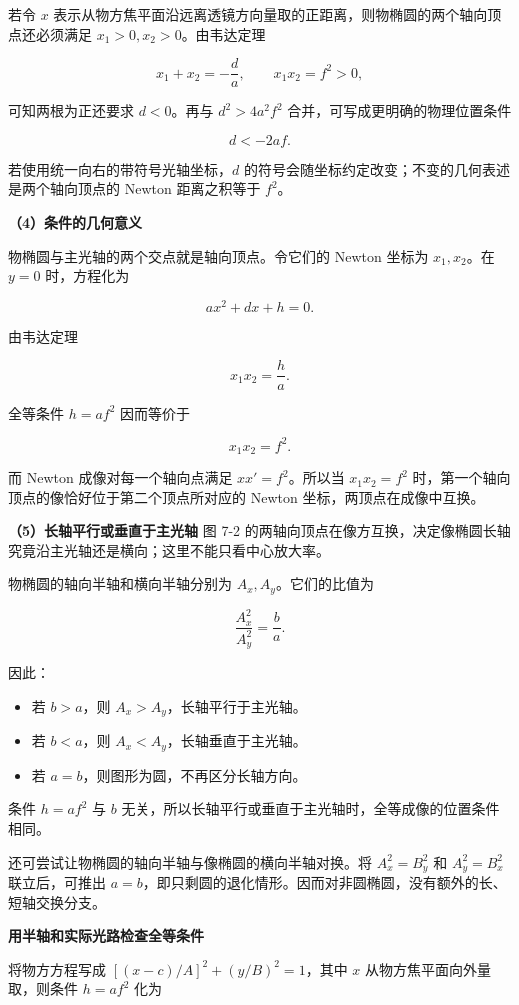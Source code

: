 \documentclass[12pt,a4paper,UTF8]{ctexart}
\newcommand{\tightlist}{\setlength{\itemsep}{0pt}\setlength{\parskip}{0pt}}
\begin{document}
若令 \(x\)
表示从物方焦平面沿远离透镜方向量取的正距离，则物椭圆的两个轴向顶点还必须满足
\(x_1>0,x_2>0\)。由韦达定理

\[x_1+x_2=-\frac da,\qquad x_1x_2=f^2>0,\]

可知两根为正还要求 \(d<0\)。再与 \(d^2>4a^2f^2\)
合并，可写成更明确的物理位置条件

\[\boxed{d<-2af}.\]

若使用统一向右的带符号光轴坐标，\(d\)
的符号会随坐标约定改变；不变的几何表述是两个轴向顶点的 Newton
距离之积等于 \(f^2\)。

\textbf{（4）条件的几何意义}

物椭圆与主光轴的两个交点就是轴向顶点。令它们的 Newton 坐标为
\(x_1,x_2\)。在 \(y=0\) 时，方程化为

\[ax^2+dx+h=0.\]

由韦达定理

\[x_1x_2=\frac ha.\]

全等条件 \(h=af^2\) 因而等价于

\[\boxed{x_1x_2=f^2}.\]

而 Newton 成像对每一个轴向点满足 \(xx'=f^2\)。所以当 \(x_1x_2=f^2\)
时，第一个轴向顶点的像恰好位于第二个顶点所对应的 Newton
坐标，两顶点在成像中互换。

\textbf{（5）长轴平行或垂直于主光轴} 图 7-2
的两轴向顶点在像方互换，决定像椭圆长轴究竟沿主光轴还是横向；这里不能只看中心放大率。

物椭圆的轴向半轴和横向半轴分别为 \(A_x,A_y\)。它们的比值为

\[\frac{A_x^2}{A_y^2}=\frac ba.\]

因此：

\begin{itemize}
\tightlist
\item
  若 \(b>a\)，则 \(A_x>A_y\)，长轴平行于主光轴。
\item
  若 \(b<a\)，则 \(A_x<A_y\)，长轴垂直于主光轴。
\item
  若 \(a=b\)，则图形为圆，不再区分长轴方向。
\end{itemize}

条件 \(h=af^2\) 与 \(b\)
无关，所以长轴平行或垂直于主光轴时，全等成像的位置条件相同。

还可尝试让物椭圆的轴向半轴与像椭圆的横向半轴对换。将 \(A_x^2=B_y^2\) 和
\(A_y^2=B_x^2\) 联立后，可推出
\(a=b\)，即只剩圆的退化情形。因而对非圆椭圆，没有额外的长、短轴交换分支。

\textbf{用半轴和实际光路检查全等条件}

将物方方程写成 \([(x-c)/A]^2+(y/B)^2=1\)，其中 \(x\)
从物方焦平面向外量取，则条件 \(h=af^2\) 化为
\end{document}

